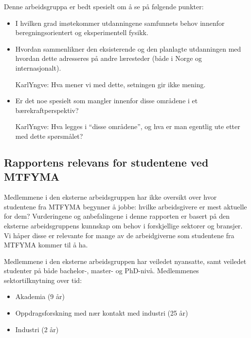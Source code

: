 \documentclass{article}
\begin{document}
Denne arbeidsgruppa er bedt spesielt om å se på følgende punkter:
\begin{itemize}
  \item I hvilken grad imøtekommer utdanningene samfunnets behov innenfor beregningsorientert og eksperimentell fysikk.
  \item Hvordan sammenlikner den eksisterende og den planlagte utdanningen med hvordan dette adresseres på andre læresteder (både i Norge og internasjonalt).

  {\color{red} KarlYngve: Hva mener vi med dette, setningen gir ikke mening.}
  \item Er det noe spesielt som mangler innenfor disse områdene i et bærekraftperspektiv?

  {\color{red} KarlYngve: Hva legges i ``disse områdene'', og hva er man egentlig ute etter med dette spørsmålet?}
\end{itemize}

\subsection{Rapportens relevans for studentene ved MTFYMA}
Medlemmene i den eksterne arbeidsgruppen har ikke oversikt over hvor studentene fra MTFYMA begynner å jobbe: hvilke arbeidsgivere er mest aktuelle for dem?
Vurderingene og anbefalingene i denne rapporten er basert på den eksterne arbeidsgruppens kunnskap om behov i forskjellige sektorer og bransjer.
Vi håper disse er relevante for mange av de arbeidgiverne som studentene fra MTFYMA kommer til å ha.

Medlemmene i den eksterne arbeidsgruppen har veiledet nyansatte, samt veiledet studenter på både bachelor-, master- og PhD-nivå.
Medlemmenes sektortilknytning over tid:


\begin{itemize}
  \item Akademia (9 år)
  \item Oppdragsforskning med nær kontakt med industri (25 år)
  \item Industri (2 år)
\end{itemize}
\end{document}
